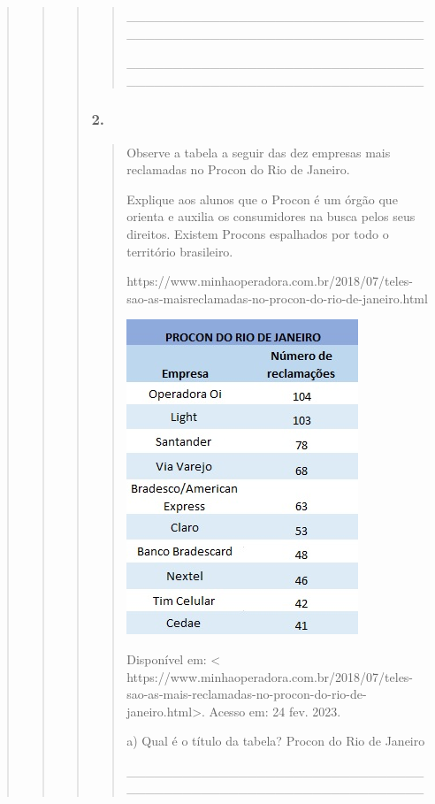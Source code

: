 \begin{quote}
\begin{quote}
\begin{quote}
\begin{quote}
\_\_\_\_\_\_\_\_\_\_\_\_\_\_\_\_\_\_\_\_\_\_\_\_\_\_\_\_\_\_\_\_\_\_\_\_\_\_\_\_\_\_\_\_\_\_\_\_\_\_\_\_\_\_\_\_\_\_\_\_\_\_\_\_

\_\_\_\_\_\_\_\_\_\_\_\_\_\_\_\_\_\_\_\_\_\_\_\_\_\_\_\_\_\_\_\_\_\_\_\_\_\_\_\_\_\_\_\_\_\_\_\_\_\_\_\_\_\_\_\_\_\_\_\_\_\_\_\_
\end{quote}

\subsubsection{2. }\label{section-67}

\begin{quote}
Observe a tabela a seguir das dez empresas mais reclamadas no Procon do
Rio de Janeiro.

Explique aos alunos que o Procon é um órgão que orienta e auxilia os
consumidores na busca pelos seus direitos. Existem Procons espalhados
por todo o território brasileiro.

https://www.minhaoperadora.com.br/2018/07/teles-sao-as-maisreclamadas-no-procon-do-rio-de-janeiro.html

\includegraphics[width=2.72917in,height=3.70833in]{media/image30.jpeg}

Disponível em: \protect\hypertarget{_Hlk128145216}{}{}\textless{}
https://www.minhaoperadora.com.br/2018/07/teles-sao-as-mais-reclamadas-no-procon-do-rio-de-janeiro.html\textgreater{}.
Acesso em: 24 fev. 2023.

a) Qual é o título da tabela? Procon do Rio de Janeiro

\_\_\_\_\_\_\_\_\_\_\_\_\_\_\_\_\_\_\_\_\_\_\_\_\_\_\_\_\_\_\_\_\_\_\_\_\_\_\_\_\_\_\_\_\_\_\_\_\_\_\_\_\_\_\_\_\_\_\_\_\_\_\_\_


\end{quote}
\end{quote}
\end{quote}
\end{quote}
